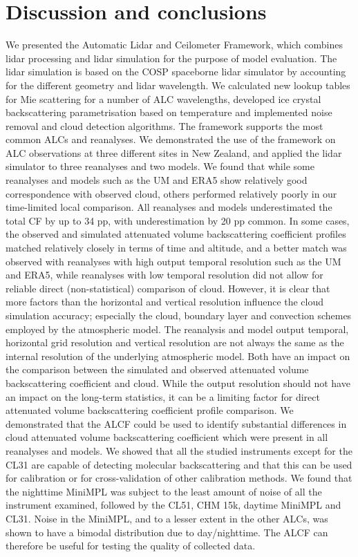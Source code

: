 \section{Discussion and conclusions}
\label{sec:3:conclusions}

We presented the Automatic Lidar and
Ceilometer Framework, which combines lidar processing and lidar simulation
for the purpose of model evaluation. The lidar simulation is based on
the COSP spaceborne lidar simulator by accounting for the different geometry
and lidar wavelength. We calculated new lookup tables for Mie scattering
for a number of ALC wavelengths, developed ice crystal backscattering parametrisation
based on temperature and implemented noise removal and cloud detection algorithms.
The framework supports the most common ALCs and reanalyses.
We demonstrated the use of the framework
on ALC observations at three different sites in New Zealand,
and applied the lidar simulator to three reanalyses and two models. We found that while
some reanalyses and models such as the UM and ERA5 show relatively good correspondence with observed
cloud, others performed relatively poorly in our time-limited local comparison. All reanalyses and models
underestimated the total CF by up to 34 pp, with underestimation by 20 pp
common. In some cases, the observed and simulated attenuated volume backscattering coefficient profiles matched
relatively closely in terms of time and altitude, and a better match was observed
with reanalyses with high output temporal resolution such as the UM and ERA5,
while reanalyses with low temporal resolution did not allow for reliable direct (non-statistical) comparison of cloud.
However, it is clear that more factors than the horizontal and vertical
resolution influence the cloud simulation
accuracy; especially the cloud, boundary layer and convection schemes employed
by the atmospheric model.
The reanalysis and model output temporal, horizontal grid resolution
and vertical resolution are not always the same as the internal resolution of
the underlying atmospheric model. Both have an impact on the comparison
between the simulated and observed attenuated volume backscattering coefficient and cloud.
While the output resolution should not have an impact on the long-term
statistics, it can be a limiting factor for direct attenuated volume backscattering coefficient profile comparison.
We demonstrated that the ALCF could be used to identify substantial
differences in cloud attenuated volume backscattering coefficient which were present in all reanalyses and models.
We showed that all the studied instruments except for the CL31 are capable of
detecting molecular backscattering and that this can be used for calibration or for cross-validation of other calibration methods.
We found that the nighttime MiniMPL was subject to the least amount of noise of all the instrument examined, followed
by the CL51, CHM 15k, daytime MiniMPL and CL31. Noise in the MiniMPL, and to a lesser extent in the other ALCs, was shown to have a bimodal distribution due to day/nighttime.
The ALCF can therefore be useful for testing the quality of collected data.

